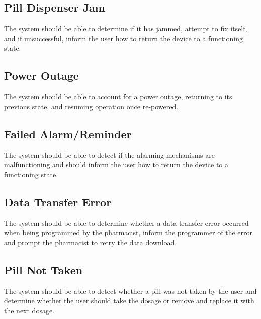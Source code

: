 \documentclass[12pt,titlepage]{article}
\begin{document}
\subsection{Pill Dispenser Jam}
The system should be able to determine if it has jammed, attempt to fix itself, and if unsuccessful, inform the user how to return the device to a functioning state.
\subsection{Power Outage}
The system should be able to account for a power outage, returning to its previous state, and resuming operation once re-powered.
\subsection{Failed Alarm/Reminder}
The system should be able to detect if the alarming mechanisms are malfunctioning and should inform the user how to return the device to a functioning state.
\subsection{Data Transfer Error}
The system should be able to determine whether a data transfer error occurred when being programmed by the pharmacist, inform the programmer of the error and prompt the pharmacist to retry the data download.
\subsection{Pill Not Taken}
The system should be able to detect whether a pill was not taken by the user and determine whether the user should take the dosage or remove and replace it with the next dosage.
\end{document}
